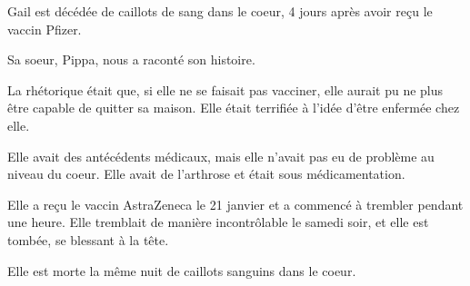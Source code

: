 Gail est décédée de caillots de sang dans le coeur, 4 jours après avoir reçu le
vaccin Pfizer.

Sa soeur, Pippa, nous a raconté son histoire.

La rhétorique était que, si elle ne se faisait pas vacciner, elle aurait pu ne
plus être capable de quitter sa maison. Elle était terrifiée à l'idée d'être
enfermée chez elle.

Elle avait des antécédents médicaux, mais elle n'avait pas eu de problème au
niveau du coeur. Elle avait de l'arthrose et était sous médicamentation.

Elle a reçu le vaccin AstraZeneca le 21 janvier et a commencé à trembler pendant
une heure. Elle tremblait de manière incontrôlable le samedi soir, et elle est
tombée, se blessant à la tête.

Elle est morte la même nuit de caillots sanguins dans le coeur.

